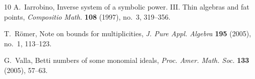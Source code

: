 \documentclass{article}
\begin{document}
\begin{thebibliography}{10}
A.~Iarrobino,  Inverse system of a symbolic power. {III}. {T}hin algebras and
  fat points, \emph{Compositio Math.} \textbf{108} (1997), no.~3, 319--356.

T.~R{\"o}mer,  Note on bounds for multiplicities, \emph{J. Pure Appl. Algebra}
  \textbf{195} (2005), no.~1, 113--123.

G.~Valla,  Betti numbers of some monomial ideals, \emph{Proc. Amer. Math. Soc.}
  \textbf{133} (2005), 57--63.

\end{thebibliography}
\end{document}
